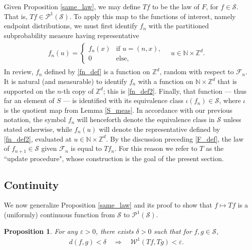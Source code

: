 \documentclass[11pt,reqno]{amsart}
\numberwithin{equation}{section}
\newtheorem{prop}[thm]{Proposition}
\theoremstyle{definition}
\begin{document}
Given Proposition \ref{same_law}, we may define $Tf$ to be the law of $F$, for $f \in {\mathcal{S}}$.
That is, $Tf \in {\mathcal{P}}^1({\mathcal{S}})$.
To apply this map to the functions of interest, namely endpoint distributions, we must first identify $f_{n}$ with the partitioned subprobability measure having representative
{\begin{align} \begin{split} {
f_n(u) = \begin{cases} 
f_n(x) &\text{if } u = (n,x), \\
0 &\text{else,}
\end{cases} \quad
u \in {\mathbb{N}} \times {\mathbb{Z}}^d. \label{fn_def2}
} \end{split} \end{align}}
In review, $f_n$ defined by \eqref{fn_def} is a function on ${\mathbb{Z}}^d$, random with respect to ${\mathcal{F}}_n$.
It is natural (and measurable) to identify $f_n$ with a function on ${\mathbb{N}} \times {\mathbb{Z}}^d$ that is supported on the $n$-th copy of ${\mathbb{Z}}^d$; this is \eqref{fn_def2}.
Finally, that function --- thus far an element of $S$ --- is identified with its equivalence class $\iota(f_n) \in {\mathcal{S}}$, where $\iota$ is the quotient map from Lemma \ref{S_meas}.
In accordance with our previous notation, the symbol $f_n$ will henceforth denote the equivalence class in ${\mathcal{S}}$ unless stated otherwise, while $f_n(u)$ will denote the representative defined by \eqref{fn_def2}, evaluated at $u \in {\mathbb{N}} \times {\mathbb{Z}}^d$.
By the discussion preceding \eqref{F_def}, the law of $f_{n+1} \in {\mathcal{S}}$ given ${\mathcal{F}}_n$ is equal to $Tf_n$.
For this reason we refer to $T$ as the ``update procedure", whose construction is the goal of the present section.

\subsection{Continuity} \label{transformation-continuity}
We now generalize Proposition \ref{same_law} and its proof to show that $f \mapsto Tf$ is a (uniformly) continuous function from ${\mathcal{S}}$ to ${\mathcal{P}}^1({\mathcal{S}})$.

\begin{prop} \label{continuous1}
For any ${\varepsilon} > 0$, there exists $\delta > 0$ such that for $f,g \in {\mathcal{S}}$,
{\begin{align*} {
d(f,g) < \delta \quad \Rightarrow \quad {\mathcal{W}}^1(Tf,Tg) < {\varepsilon}.
} \end{align*}}
\end{prop}
\end{document}
